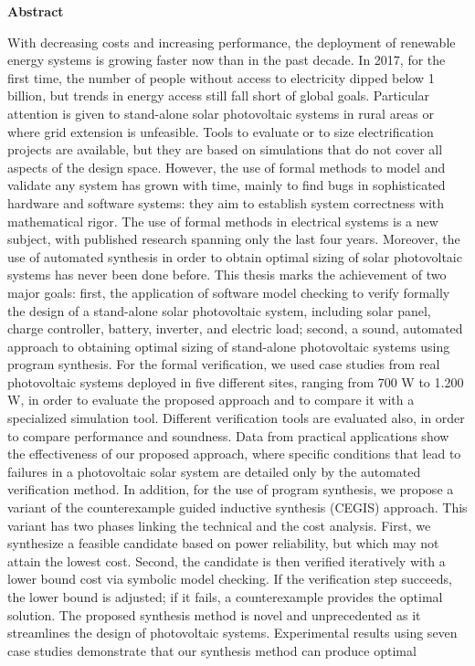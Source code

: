 \thispagestyle{plain}
\begin{center}
%    
%    
%    
    \vspace{0.9cm}
    \textbf{Abstract}
\end{center}
With decreasing costs and increasing performance, the deployment of renewable energy systems is growing faster now than in the past decade. In 2017, for the first time, the number of people without access to electricity dipped below 1 billion, but trends in energy access still fall short of global goals. Particular attention is given to stand-alone solar photovoltaic systems in rural areas or where grid extension is unfeasible. Tools to evaluate or to size electrification projects are available, but they are based on simulations that do not cover all aspects of the design space. However, the use of formal methods to model and validate any system has grown with time, mainly to find bugs in sophisticated hardware and software systems: they aim to establish system correctness with mathematical rigor. The use of formal methods in electrical systems is a new subject, with published research spanning only the last four years. Moreover, the use of automated synthesis in order to obtain optimal sizing of solar photovoltaic systems has never been done before. This thesis marks the achievement of two major goals: first, the application of software model checking to verify formally the design of a stand-alone solar photovoltaic system, including solar panel, charge controller, battery, inverter, and electric load; second, a sound, automated approach to obtaining optimal sizing of stand-alone photovoltaic systems using program synthesis. For the formal verification, we used case studies from real photovoltaic systems deployed in five different sites, ranging from 700 W to 1.200 W, in order to evaluate the proposed approach and to compare  it with a specialized simulation tool. Different verification tools are evaluated also, in order to compare performance and soundness. Data from practical applications show the effectiveness of our proposed approach, where specific conditions that lead to failures in a photovoltaic solar system are detailed only by the automated verification method. In addition, for the use of program synthesis, we propose a variant of the counterexample guided inductive synthesis (CEGIS) approach. This variant has two phases linking the technical and the cost analysis. First, we synthesize a feasible candidate based on power reliability, but which may not attain the lowest cost. Second, the candidate is then verified iteratively with a lower bound cost via symbolic model checking. If the verification step succeeds, the lower bound is adjusted; if it fails, a counterexample provides the optimal solution. The proposed synthesis method is novel and unprecedented as it streamlines the design of photovoltaic systems. Experimental results using seven case studies demonstrate that our synthesis method can produce optimal 